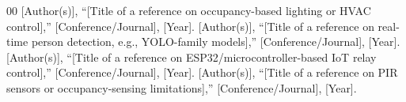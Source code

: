 \documentclass[conference]{IEEEtran}
\begin{document}
\begin{thebibliography}{00}
 [Author(s)], ``[Title of a reference on occupancy-based lighting or HVAC control],'' [Conference/Journal], [Year].
 [Author(s)], ``[Title of a reference on real-time person detection, e.g., YOLO-family models],'' [Conference/Journal], [Year].
 [Author(s)], ``[Title of a reference on ESP32/microcontroller-based IoT relay control],'' [Conference/Journal], [Year].
 [Author(s)], ``[Title of a reference on PIR sensors or occupancy-sensing limitations],'' [Conference/Journal], [Year].
\end{thebibliography}
\end{document}
